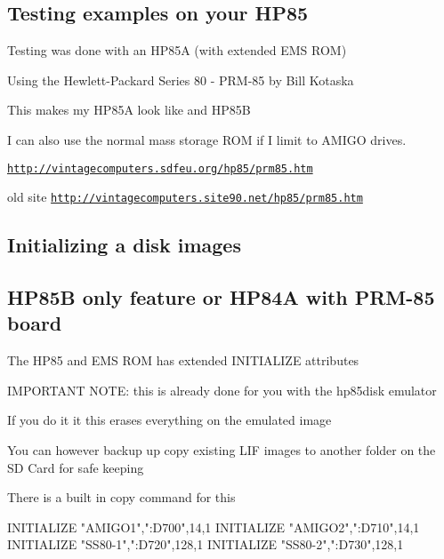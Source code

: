 \subsection*{Testing examples on your H\+P85}


\begin{DoxyItemize}
\item Testing was done with an H\+P85A (with extended E\+MS R\+OM)
\begin{DoxyItemize}
\item Using the Hewlett-\/\+Packard Series 80 -\/ P\+R\+M-\/85 by Bill Kotaska
\item This makes my H\+P85A look like and H\+P85B
\begin{DoxyItemize}
\item I can also use the normal mass storage R\+OM if I limit to A\+M\+I\+GO drives.
\item \href{http://vintagecomputers.sdfeu.org/hp85/prm85.htm}{\tt http\+://vintagecomputers.\+sdfeu.\+org/hp85/prm85.\+htm}
\begin{DoxyItemize}
\item old site \href{http://vintagecomputers.site90.net/hp85/prm85.htm}{\tt http\+://vintagecomputers.\+site90.\+net/hp85/prm85.\+htm}
\end{DoxyItemize}
\end{DoxyItemize}
\end{DoxyItemize}
\end{DoxyItemize}

\subsection*{Initializing a disk images}

\subsection*{H\+P85B only feature or H\+P84A with P\+R\+M-\/85 board}


\begin{DoxyItemize}
\item The H\+P85 and E\+MS R\+OM has extended I\+N\+I\+T\+I\+A\+L\+I\+ZE attributes
\item I\+M\+P\+O\+R\+T\+A\+NT N\+O\+TE\+: this is already done for you with the hp85disk emulator
\begin{DoxyItemize}
\item If you do it it this erases everything on the emulated image
\item You can however backup up copy existing L\+IF images to another folder on the SD Card for safe keeping
\begin{DoxyItemize}
\item There is a built in copy command for this 
\begin{DoxyPre}
  INITIALIZE "AMIGO1",":D700",14,1
  INITIALIZE "AMIGO2",":D710",14,1
  INITIALIZE "SS80-1",":D720",128,1
  INITIALIZE "SS80-2",":D730",128,1
\end{DoxyPre}

\end{DoxyItemize}
\end{DoxyItemize}
\end{DoxyItemize}

